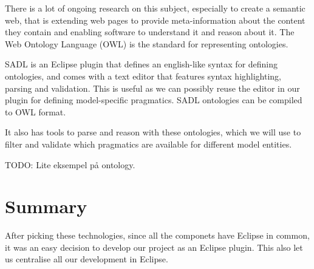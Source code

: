 There is a lot of ongoing research on this subject, especially to create a
semantic web, that is extending web pages to provide meta-information about the
content they contain and enabling software to understand it and reason about it.
The Web Ontology Language (OWL)  is the standard
for representing ontologies.

SADL is an Eclipse plugin that defines an english-like syntax for defining
ontologies, and comes with a text editor that features syntax highlighting,
parsing and validation. This is useful as we can possibly reuse the editor in
our plugin for defining model-specific pragmatics. SADL ontologies can be
compiled to OWL format.

It also has tools to parse and reason with these ontologies, which we will use
to filter and validate which pragmatics are available for different model
entities. 

TODO: Lite eksempel på ontology.

\section{Summary}
After picking these technologies, since all the componets have Eclipse in
common, it was an easy decision to develop our project as an Eclipse plugin.
This also let us centralise all our development in Eclipse.
